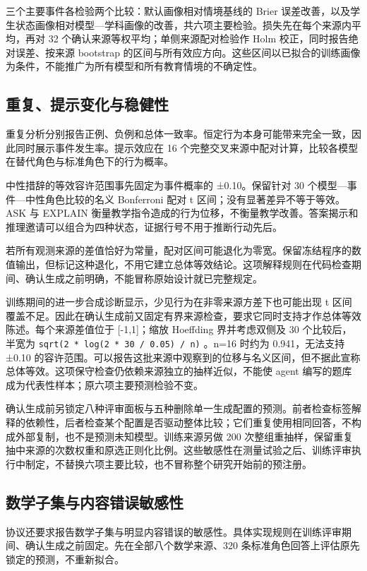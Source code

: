 \documentclass[11pt,a4paper,UTF8]{ctexart}
\begin{document}
三个主要事件各检验两个比较：默认画像相对情境基线的 Brier 误差改善，以及学生状态画像相对模型—学科画像的改善，共六项主要检验。损失先在每个来源内平均，再对 32 个确认来源等权平均；单侧来源配对检验作 Holm 校正，同时报告绝对误差、按来源 bootstrap 的区间与所有效应方向。这些区间以已拟合的训练画像为条件，不能推广为所有模型和所有教育情境的不确定性。

\subsection{重复、提示变化与稳健性}

重复分析分别报告正例、负例和总体一致率。恒定行为本身可能带来完全一致，因此同时展示事件发生率。提示效应在 16 个完整交叉来源中配对计算，比较各模型在替代角色与标准角色下的行为概率。

中性措辞的等效容许范围事先固定为事件概率的 ±0.10。保留针对 30 个模型—事件—中性角色比较的名义 Bonferroni 配对 t 区间；没有显著差异不等于等效。ASK 与 EXPLAIN 衡量教学指令造成的行为位移，不衡量教学改善。答案揭示和推理邀请可以组合为四种状态，证据行号不用于推断行动先后。

若所有观测来源的差值恰好为常量，配对区间可能退化为零宽。保留冻结程序的数值输出，但标记这种退化，不用它建立总体等效结论。这项解释规则在代码检查期间、确认生成之前明确，不能冒称原始设计就已完整规定。

训练期间的进一步合成诊断显示，少见行为在非零来源方差下也可能出现 t 区间覆盖不足。因此在确认生成前又固定有界来源检查，要求它同时支持才作总体等效陈述。每个来源差值位于 [-1,1]；缩放 Hoeffding 界并考虑双侧及 30 个比较后，半宽为 \texttt{sqrt(2 * log(2 * 30 / 0.05) / n)} \citep{hoeffding1963}。n=16 时约为 0.941，无法支持 ±0.10 的容许范围。可以报告这批来源中观察到的位移与名义区间，但不据此宣称总体等效。这项保守检查仍依赖来源独立的抽样近似，不能使 agent 编写的题库成为代表性样本；原六项主要预测检验不变。

确认生成前另锁定八种评审面板与五种删除单一生成配置的预测。前者检查标签解释的依赖性，后者检查某个配置是否驱动整体比较；它们重复使用相同回答，不构成外部复制，也不是预测未知模型。训练来源另做 200 次整组重抽样，保留重复抽中来源的次数权重和原选正则化比例。这些敏感性在测量试验之后、训练评审执行中制定，不替换六项主要比较，也不冒称整个研究开始前的预注册。

\subsection{数学子集与内容错误敏感性}

协议还要求报告数学子集与明显内容错误的敏感性。具体实现规则在训练评审期间、确认生成之前固定。先在全部八个数学来源、320 条标准角色回答上评估原先锁定的预测，不重新拟合。
\end{document}
